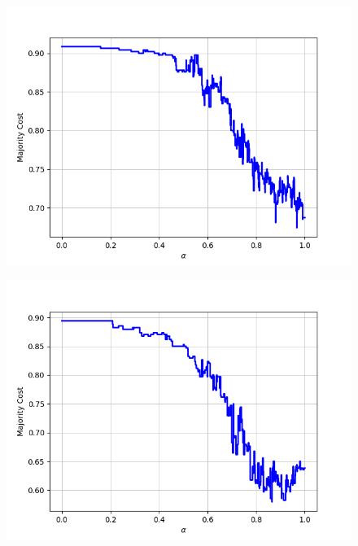 \begin{figure}[H]
\begin{minipage}{.24\textwidth}
  {\includegraphics[width=\linewidth]{plots/omniglot-intra-sc/Sanskrit}}
\end{minipage}
\begin{minipage}{.24\textwidth}
  \centering
  {\includegraphics[width=\linewidth]{plots/omniglot-intra-sc/Syriac_(Estrangelo)}}
\end{minipage}
\begin{minipage}{.24\textwidth}
  \centering

\end{minipage}
\end{figure}
